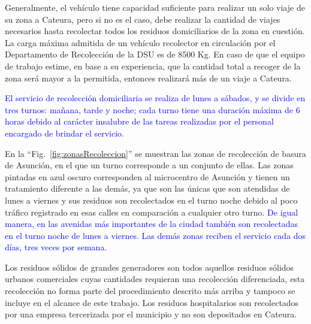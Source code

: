 \documentclass[spanish, conference]{IEEEtran}
\begin{document}
{Generalmente, el vehículo tiene capacidad suficiente para realizar un solo viaje de su zona a Cateura, pero si no es el caso, debe realizar la cantidad de viajes necesarios hasta recolectar todos los residuos domiciliarios de la zona en cuestión. La carga máxima admitida de un vehículo recolector en circulación por el Departamento de Recolección de la DSU es de 8500 Kg. En caso de que el equipo de trabajo estime, en base a su experiencia, que la cantidad total a recoger de la zona será mayor a la permitida, entonces realizará más de un viaje a Cateura.

\textcolor{blue}{El servicio de recolección domiciliaria se realiza de lunes a sábados, y se divide en tres turnos: mañana, tarde y noche; cada turno tiene una duración máxima de 6 horas debido al carácter insalubre de las tareas realizadas por el personal encargado de brindar el servicio.}

En la ``Fig.~\ref{fig:zonasRecoleccion}'' se muestran las zonas de recolección de basura de Asunción, en el que un turno corresponde a un conjunto de ellas. Las zonas pintadas en azul oscuro corresponden al microcentro de Asunción y tienen un tratamiento diferente a las demás, ya que son las únicas que son atendidas de lunes a viernes y sus residuos son recolectados en el turno noche debido al poco tráfico registrado en esas calles en comparación a cualquier otro turno. \textcolor{blue}{De igual manera, en las avenidas más importantes de la ciudad también son recolectadas en el turno noche de lunes a viernes. Las demás zonas reciben el servicio cada dos días, tres veces por semana.}

Los residuos sólidos de grandes generadores son todos aquellos residuos sólidos urbanos comerciales cuyas cantidades requieran una recolección diferenciada, esta recolección no forma parte del procedimiento descrito más arriba y tampoco se incluye en el alcance de este trabajo. Los residuos hospitalarios son recolectados por una empresa tercerizada por el municipio y no son depositados en Cateura.


}
\end{document}
